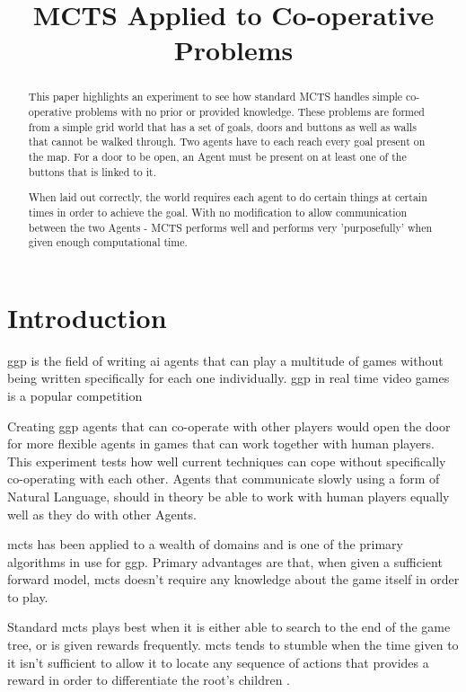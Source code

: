 \documentclass{IEEEtran}
\title{MCTS Applied to Co-operative Problems}
\begin{document}
\maketitle
\begin{abstract}
This paper highlights an experiment to see how standard MCTS handles simple co-operative problems with no prior or provided knowledge. These problems are formed from a simple grid world that has a set of goals, doors and buttons as well as walls that cannot be walked through. Two agents have to each reach every goal present on the map. For a door to be open, an Agent must be present on at least one of the buttons that is linked to it.

When laid out correctly, the world requires each agent to do certain things at certain times in order to achieve the goal. With no modification to allow communication between the two Agents - MCTS performs well and performs very 'purposefully' when given enough computational time.
\end{abstract}

\section{Introduction}
\gls{ggp} is the field of writing \gls{ai} agents that can play a multitude of games without being written specifically for each one individually. \gls{ggp} in real time video games is a popular competition \cite{perez2014}

Creating \gls{ggp} agents that can co-operate with other players would open the door for more flexible agents in games that can work together with human players. This experiment tests how well current techniques can cope without specifically co-operating with each other. Agents that communicate slowly using a form of Natural Language, should in theory be able to work with human players equally well as they do with other Agents.

\gls{mcts} \cite{browne2012survey} has been applied to a wealth of domains and is one of the primary algorithms in use for \gls{ggp}\cite{finnsson2008simulation}. Primary advantages are that, when given a sufficient forward model, \gls{mcts} doesn't require any knowledge about the game itself in order to play.

Standard \gls{mcts} plays best when it is either able to search to the end of the game tree, or is given rewards frequently. \gls{mcts} tends to stumble when the time given to it isn't sufficient to allow it to locate any sequence of actions that provides a reward in order to differentiate the root's children \cite{perez2012monte}.
\end{document}
